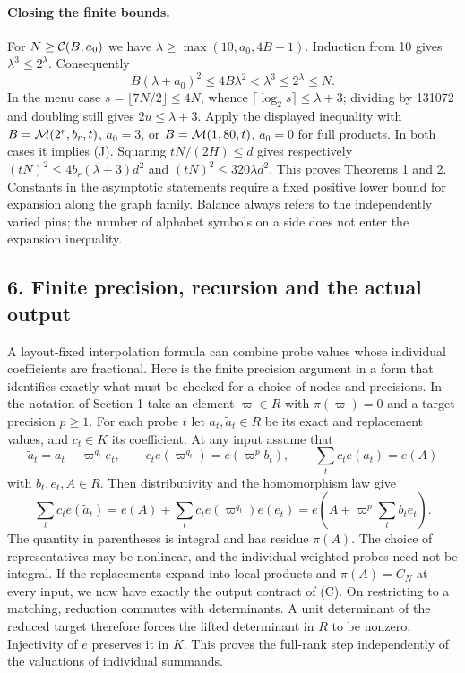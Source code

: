 \documentclass[
  11pt,
]{article}
\newcommand{\floor}[1]{\lfloor #1\rfloor}
\newcommand{\ceil}[1]{\lceil #1\rceil}
\begin{document}
\paragraph{Closing the finite bounds.}
For \(N\ge{\cal C}(B,a_0)\) we have \(\lambda\ge\max(10,a_0,4B+1)\).
Induction from 10 gives \(\lambda^3\le 2^\lambda\). Consequently
\[
 B(\lambda+a_0)^2\le4B\lambda^2<\lambda^3\le 2^\lambda\le N .
\]
In the menu case \(s=\floor{7N/2}\le4N\), whence
\(\ceil{\log_2 s}\le\lambda+3\); dividing by 131072 and doubling
still gives \(2u\le\lambda+3\). Apply the displayed inequality with
\(B={\cal M}(2^r,b_r,t)\), \(a_0=3\), or
\(B={\cal M}(1,80,t)\), \(a_0=0\) for full products. In both cases it
implies (J). Squaring \(tN/(2H)\le d\) gives respectively
\((tN)^2\le4 b_r(\lambda+3)d^2\) and \((tN)^2\le320\lambda d^2\).
This proves Theorems 1 and 2. Constants in the asymptotic statements
require a fixed positive lower bound for expansion along the graph family.
Balance always refers to the independently varied pins; the number of
alphabet symbols on a side does not enter the expansion inequality.

\subsection{6. Finite precision, recursion and the actual
output}\label{finite-precision-recursion-and-the-actual-output}

A layout-fixed interpolation formula can combine probe values whose
individual coefficients are fractional. Here is the finite precision
argument in a form that identifies exactly what must be checked for a
choice of nodes and precisions. In the notation of Section 1 take an
element \(\varpi\in R\) with \(\pi(\varpi)=0\) and a target precision
\(p\ge1\). For each probe \(t\) let \(a_t,\widetilde a_t\in R\)
be its exact and replacement values, and \(c_t\in K\) its coefficient.
At any input assume that
\[
 \widetilde a_t=a_t+\varpi^{q_t}e_t,\qquad
 c_t e(\varpi^{q_t})=e(\varpi^p b_t),\qquad
 \sum_t c_t e(a_t)=e(A)
\]
with \(b_t,e_t,A\in R\). Then distributivity and the homomorphism law give
\[
 \sum_t c_t e(\widetilde a_t)
   =e(A)+\sum_t c_t e(\varpi^{q_t})e(e_t)
   =e\!\left(A+\varpi^p\sum_t b_t e_t\right).
\]
The quantity in parentheses is integral and has residue \(\pi(A)\).
The choice of representatives may be nonlinear, and the individual
weighted probes need not be integral. If the replacements expand into
local products and \(\pi(A)=C_N\) at every input, we now have exactly
the output contract of (C). On restricting to a matching, reduction
commutes with determinants. A unit determinant of the reduced target
therefore forces the lifted determinant in \(R\) to be nonzero.
Injectivity of \(e\) preserves it in \(K\). This proves the full-rank
step independently of the valuations of individual summands.
\end{document}
